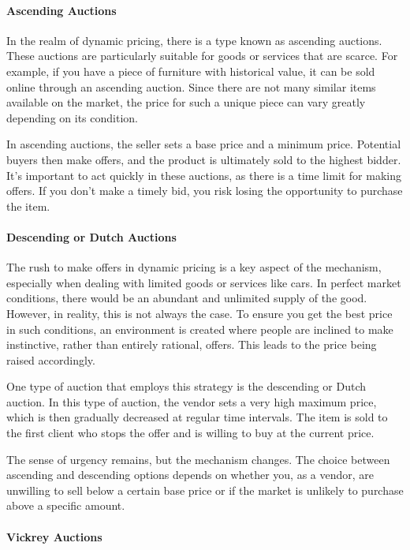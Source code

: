\paragraph{Ascending Auctions}\label{ascending-auctions}

In the realm of dynamic pricing, there is a type known as ascending
auctions. These auctions are particularly suitable for goods or services
that are scarce. For example, if you have a piece of furniture with
historical value, it can be sold online through an ascending auction.
Since there are not many similar items available on the market, the
price for such a unique piece can vary greatly depending on its
condition.

In ascending auctions, the seller sets a base price and a minimum price.
Potential buyers then make offers, and the product is ultimately sold to
the highest bidder. It's important to act quickly in these auctions, as
there is a time limit for making offers. If you don't make a timely bid,
you risk losing the opportunity to purchase the item.

\paragraph{Descending or Dutch
  Auctions}\label{descending-or-dutch-auctions}

The rush to make offers in dynamic pricing is a key aspect of the
mechanism, especially when dealing with limited goods or services like
cars. In perfect market conditions, there would be an abundant and
unlimited supply of the good. However, in reality, this is not always
the case. To ensure you get the best price in such conditions, an
environment is created where people are inclined to make instinctive,
rather than entirely rational, offers. This leads to the price being
raised accordingly.

One type of auction that employs this strategy is the descending or
Dutch auction. In this type of auction, the vendor sets a very high
maximum price, which is then gradually decreased at regular time
intervals. The item is sold to the first client who stops the offer and
is willing to buy at the current price.

The sense of urgency remains, but the mechanism changes. The choice
between ascending and descending options depends on whether you, as a
vendor, are unwilling to sell below a certain base price or if the
market is unlikely to purchase above a specific amount.

\paragraph{Vickrey Auctions}\label{victory-auctions}

